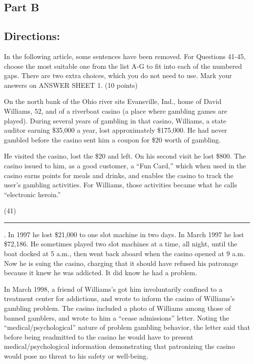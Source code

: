 \documentclass[UTF8,11pt]{ctexart}
\begin{document}
\subsection*{\textbf{Part B}}


\subsection*{\textbf{Directions:}}


In the following article, some sentences have been removed. For Questions 41-45, choose the most suitable one from the list A-G to fit into each of the numbered gaps. There are two extra choices, which you do not need to use. Mark your answers on ANSWER SHEET 1. (10 points)


On the north bank of the Ohio river sits Evansville, Ind., home of David Williams, 52, and of a riverboat casino (a place where gambling games are played). During several years of gambling in that casino, Williams, a state auditor earning \$35,000 a year, lost approximately \$175,000. He had never gambled before the casino sent him a coupon for \$20 worth of gambling.


He visited the casino, lost the \$20 and left. On his second visit he lost \$800. The casino issued to him, as a good customer, a “Fun Card,” which when used in the casino earns points for meals and drinks, and enables the casino to track the user’s gambling activities. For Williams, those activities became what he calls “electronic heroin.”


(41) \par\noindent\rule{.95\linewidth}{.4pt}\par . In 1997 he lost \$21,000 to one slot machine in two days. In March 1997 he lost \$72,186. He sometimes played two slot machines at a time, all night, until the boat docked at 5 a.m., then went back aboard when the casino opened at 9 a.m. Now he is suing the casino, charging that it should have refused his patronage because it knew he was addicted. It did know he had a problem.


In March 1998, a friend of Williams’s got him involuntarily confined to a treatment center for addictions, and wrote to inform the casino of Williams’s gambling problem. The casino included a photo of Williams among those of banned gamblers, and wrote to him a “cease admissions” letter. Noting the “medical/psychological” nature of problem gambling behavior, the letter said that before being readmitted to the casino he would have to present medical/psychological information demonstrating that patronizing the casino would pose no threat to his safety or well-being.
\end{document}
